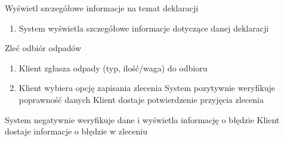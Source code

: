 	\begin{usecase}{Wyświetl szczegółowe informacje na temat deklaracji}
		\author{Beata Obrok} 
		\maketitle
\begin{scenario}
			\begin{enumerate}
				\item System wyświetla szczegółowe informacje dotyczące danej deklaracji
			\end{enumerate}
\end{scenario}
\end{usecase}

	

	\begin{usecase}{Zleć odbiór odpadów}
		\author{Dawid Suder}
		\maketitle
		\begin{scenario}
			\begin{enumerate}
				\item Klient zgłasza odpady (typ, ilość/waga) do odbioru
				\item Klient wybiera opcję zapisania zlecenia
				 System pozytywnie weryfikuje poprawność danych
				 Klient dostaje potwierdzenie przyjęcia zlecenia
			\end{enumerate}
		\end{scenario}
		\begin{extensions}
			\begin{enumerate}
				 System negatywnie weryfikuje dane i wyświetla informację o błędzie
				 Klient dostaje informacje o błędzie w zleceniu
			\end{enumerate}
		\end{extensions}
\end{usecase}

